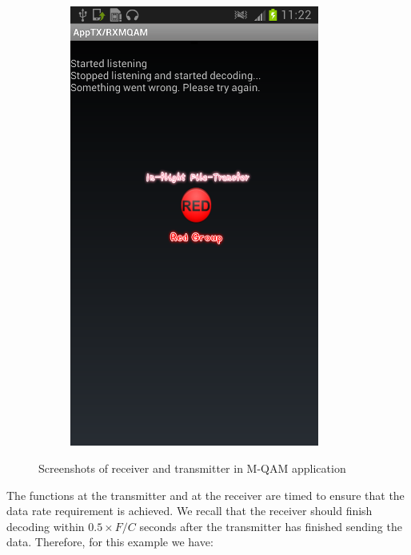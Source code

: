 \documentclass[12pt,a4paper,openright]{report}
\begin{document}
\begin{figure}[H]
\begin{subfigure}{.3\textwidth}
         \includegraphics[width=0.9\textwidth]{somethingwentwrong.png}
         \label{fig:appRXsideError}
      \end{subfigure}
     \caption[Screenshots of receiver and transmitter in M-QAM application]{Screenshots of receiver and transmitter in M-QAM application}
     \label{fig:screenshots}
 \end{figure} 


The functions at the transmitter and at the receiver are timed to ensure that the data rate requirement is achieved. We recall that the receiver should finish decoding within $0.5\times F/C$ seconds after the transmitter has finished sending the data. Therefore, for this example we have:
\end{document}
